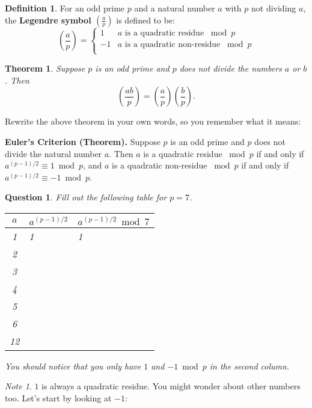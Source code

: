 \documentclass[12pt]{amsart}
\theoremstyle{plain}
\newtheorem{thm}{Theorem}
\newtheorem{quest}{Question}
\theoremstyle{definition}
\newtheorem*{defn}{Definition}
\theoremstyle{remark}
\newtheorem*{note}{Note}
\begin{document}
\begin{defn} For an odd prime $p$ and a natural number $a$ with $p$ not dividing $a$, the \textbf{Legendre symbol $\left( \frac{a}{p}\right)$} is defined to be:
\[ \left( \frac{a}{p}\right) = \begin{cases} 
      1 & a \text{ is a quadratic residue } \bmod p \\
      -1 & a \text{ is a quadratic non-residue } \bmod p \\
   \end{cases}
\]
\end{defn}

\begin{thm}
Suppose $p$ is an odd prime and $p$ does not divide the numbers $a$ or $b$.  Then $$\left( \frac{ab}{p}\right) = \left( \frac{a}{p}\right)\left( \frac{b}{p}\right).$$
\end{thm}

Rewrite the above theorem in your own words, so you remember what it means:\\ \vspace{1in}

\noindent \textbf{Euler's Criterion (Theorem).}
Suppose $p$ is an odd prime and $p$ does not divide the natural number $a$.  Then $a$ is a quadratic residue $\bmod p$ if and only if $a^{(p-1)/2} \equiv 1 \bmod p$, and $a$ is a quadratic non-residue $\bmod p$ if and only if $a^{(p-1)/2} \equiv -1 \bmod p$.

\newpage \begin{quest} 
Fill out the following table for $p = 7$.
\begin{center}
\begin{tabular}{|c|p{2in}|p{2in}|} \hline
$a$ & $a^{(p-1)/2}$ & $a^{(p-1)/2} \bmod 7$\\ \hline
1&1&1\\ [.2in]
2&&\\ [.2in]
3&&\\ [.2in]
4&&\\ [.2in]
5&&\\ [.2in]
6&&\\ [.2in]
12&&\\  [.2in]\hline
\end{tabular}
\end{center}
You should notice that you only have $1$ and $-1 \bmod p$ in the second column.
\end{quest}

\begin{note}
$1$ is always a quadratic residue.  You might wonder about other numbers too.  Let's start by looking at $-1$:
\end{note}
\end{document}
